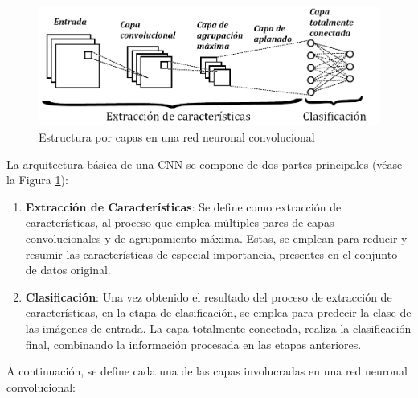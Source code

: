 \begin{figure}[H]
	\centering
	\includegraphics[scale=0.35]{imagenes/CNN_estructura.jpg}  
	\caption{Estructura por capas en una red neuronal convolucional}
	\label{fig:CNN_estructura}
\end{figure}

La arquitectura básica de una CNN se compone de dos partes principales (véase la Figura \ref{fig:CNN_estructura}):

\begin{enumerate} [label=\textbullet]
	\item \textbf{Extracción de Características}: Se define como extracción de características, al proceso que emplea múltiples pares de capas convolucionales y de agrupamiento máxima. Estas, se emplean para reducir y resumir las características de especial importancia, presentes en el conjunto de datos original.
	\item \textbf{Clasificación}: Una vez obtenido el resultado del proceso de extracción de características, en la etapa de clasificación, se emplea para predecir la clase de las imágenes de entrada. La capa totalmente conectada, realiza la clasificación final, combinando la información procesada en las etapas anteriores.
\end{enumerate}

A continuación, se define cada una de las capas involucradas en una red neuronal convolucional:

